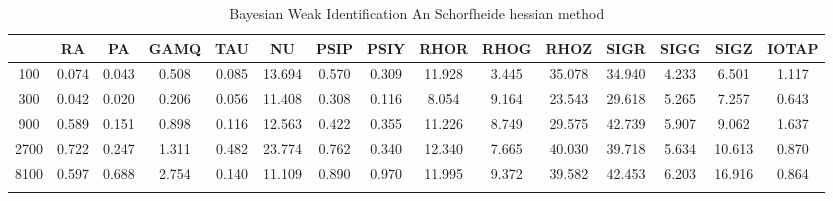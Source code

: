 \documentclass[a4paper,10pt]{article}
\begin{document}
\centering
\begin{longtable}{ccccccccccccccc}
\toprule
 & RA & PA & GAMQ & TAU & NU & PSIP & PSIY & RHOR & RHOG & RHOZ & SIGR & SIGG & SIGZ & IOTAP \\
\midrule
100 & 0.074 & 0.043 & 0.508 & 0.085 & 13.694 & 0.570 & 0.309 & 11.928 & 3.445 & 35.078 & 34.940 & 4.233 & 6.501 & 1.117 \\
300 & 0.042 & 0.020 & 0.206 & 0.056 & 11.408 & 0.308 & 0.116 & 8.054 & 9.164 & 23.543 & 29.618 & 5.265 & 7.257 & 0.643 \\
900 & 0.589 & 0.151 & 0.898 & 0.116 & 12.563 & 0.422 & 0.355 & 11.226 & 8.749 & 29.575 & 42.739 & 5.907 & 9.062 & 1.637 \\
2700 & 0.722 & 0.247 & 1.311 & 0.482 & 23.774 & 0.762 & 0.340 & 12.340 & 7.665 & 40.030 & 39.718 & 5.634 & 10.613 & 0.870 \\
8100 & 0.597 & 0.688 & 2.754 & 0.140 & 11.109 & 0.890 & 0.970 & 11.995 & 9.372 & 39.582 & 42.453 & 6.203 & 16.916 & 0.864 \\
\bottomrule
\caption{Bayesian Weak Identification An Schorfheide hessian method}
\label{table:tbl:WeakAnScho_hessian}
\end{longtable}
\end{document}
